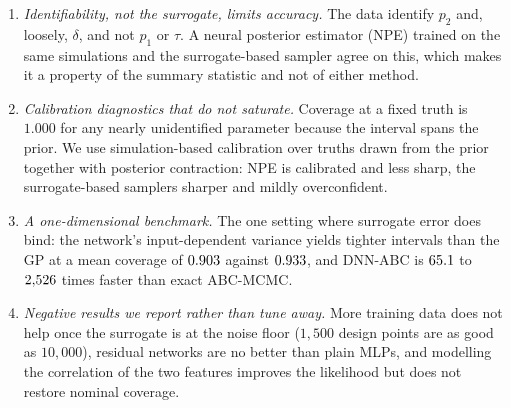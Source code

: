\documentclass[sn-basic,iicol,pdflatex]{sn-jnl}
\begin{document}
\begin{enumerate}[label=(\roman*),leftmargin=*,itemsep=2pt,topsep=2pt]
and sampler are needed at all in four dimensions, since it uses exactly the same data and
features. It separates the two ways a surrogate-based posterior can go wrong, the
surrogate's variance model and the sampler, because it has neither. And, being
amortized, it returns posterior draws for a new data set in seconds with no further
simulation, which GPS-ABC and DNN-ABC cannot do.
\item \emph{Identifiability, not the surrogate, limits accuracy.} The data identify
$p_2$ and, loosely, $\delta$, and not $p_1$ or $\tau$. A neural posterior estimator (NPE)
trained on the same simulations and the surrogate-based sampler agree on this, which
makes it a property of the summary statistic and not of either method.
\item \emph{Calibration diagnostics that do not saturate.} Coverage at a fixed
truth is $1.000$ for any nearly unidentified parameter because the interval spans the
prior. We use simulation-based calibration over truths drawn from the prior
\citep{talts2018} together with posterior contraction: NPE is calibrated and less sharp,
the surrogate-based samplers sharper and mildly overconfident.
\item \emph{A one-dimensional benchmark.} The one setting where surrogate error
does bind: the network's input-dependent variance yields tighter
intervals than the GP at a mean coverage of $0.903$ against $0.933$, and DNN-ABC is $65.1$ to $2{,}526$
times faster than exact ABC-MCMC.
\item \emph{Negative results we report rather than tune away.} More training
data does not help once the surrogate is at the noise floor ($1{,}500$ design points
are as good as $10{,}000$), residual networks are no better than plain MLPs, and
modelling the correlation of the two features improves the likelihood but does not
restore nominal coverage.
\end{enumerate}
\end{document}
